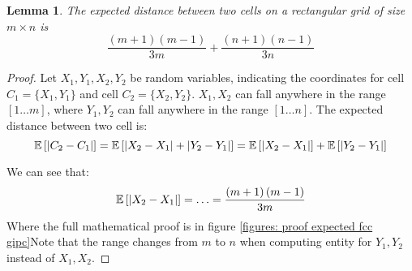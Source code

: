 \documentclass[letterpaper, 10 pt, conference]{ieeeconf}  %
\newtheorem{lemma}[theorem]{Lemma}
\DeclarePairedDelimiter\abs{\lvert}{\rvert}%
\begin{document}
\begin{lemma}
The expected distance between two cells on a rectangular grid of size $m\times n$ is \[\frac{\left(m+1\right)\left(m-1\right)}{3m}+\frac{\left(n+1\right)\left(n-1\right)}{3n}\] 
\label{lemmas:ExpectedDistanceTwoCellsRectangular}
\end{lemma}
\begin{proof}
Let $X_1,Y_1,X_2,Y_2$ be random variables, indicating the coordinates for cell $C_1=\lbrace X_1, Y_1 \rbrace$ and  cell $C_2=\lbrace X_2, Y_2 \rbrace$. $X_1,X_2$ can fall anywhere in the range $\left[1\ldots m\right]$, where $Y_1,Y_2$ can fall anywhere in the range $\left[1\ldots n\right]$.
The expected distance between two cell is:
\begin{dmath*}[compact]
\mathbb{E}\left[\abs*{C_2-C_1}\right]=\mathbb{E}\left[\abs*{X_2-X_1} + \abs*{Y_2-Y_1}\right]=\mathbb{E}\left[\abs*{X_2-X_1}\right]+\mathbb{E}\left[\abs*{Y_2-Y_1}\right]\end{dmath*}

We can see that:
\begin{dmath*}[compact]
\mathbb{E}\left[\abs*{X_2-X_1}\right]=\ldots =\frac{\left(m+1\right)\left(m-1\right)}{3m}
\end{dmath*}
Where the full mathematical proof is in figure \ref{figures: proof expected fcc gipc}Note that the range changes from $m$ to $n$ when computing entity for $Y_1,Y_2$ instead of $X_1, X_2$.

\end{proof}
\end{document}
